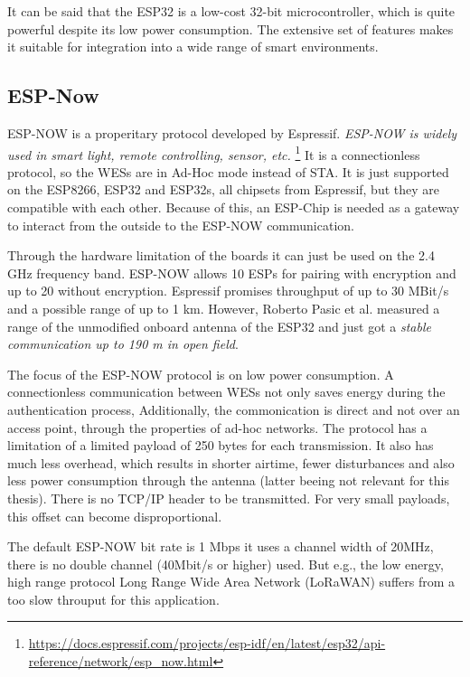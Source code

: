 It can be said that the ESP32 is a low-cost 32-bit microcontroller,
which is quite powerful despite its low power consumption.
The extensive set of features makes it suitable for integration into a wide range of smart environments.
\cite{TheWorkingPrincipalsOfESP32}

\subsection*{ESP-Now}
\label{sub:espnow}
ESP-NOW is a properitary protocol developed by Espressif. 
\emph{ESP-NOW is widely used in smart light, remote controlling, sensor, etc.}
\footnote{\url{https://docs.espressif.com/projects/esp-idf/en/latest/esp32/api-reference/network/esp_now.html}\label{note:espressif}}
It is a connectionless protocol, so the \ac{WES}s are in Ad-Hoc mode instead of \ac{STA}.
It is just supported on the ESP8266, ESP32 and ESP32s, all chipsets from Espressif, but they are compatible with each other.
Because of this, an ESP-Chip is needed as a gateway to interact from the outside to the ESP-NOW communication. 

Through the hardware limitation of the boards it can just be used on the 2.4 GHz frequency band.
ESP-NOW allows 10 ESPs for pairing with encryption and up to 20 without encryption.
Espressif promises throughput of up to 30 MBit/s and a possible range of up to 1 km.
However, Roberto Pasic et al. \cite{ESPNOWCommunication} measured a range of the unmodified onboard antenna of the ESP32 
and just got a \emph{stable communication up to 190 m in open field}.

The focus of the ESP-NOW protocol is on low power consumption.
A connectionless communication between \ac{WES}s not only saves energy during the authentication process, 
Additionally, the commonication is direct and not over an access point, through the properties of ad-hoc networks.
The protocol has a limitation of a limited payload of 250 bytes for each transmission.
It also has much less overhead, which results in shorter airtime, fewer disturbances and also less power consumption through the antenna 
(latter beeing not relevant for this thesis).
There is no TCP/IP header to be transmitted. 
For very small payloads, this offset can become disproportional.

The default ESP-NOW bit rate is 1 Mbps it uses a channel width of 20MHz, 
there is no double channel (40Mbit/s or higher) used.
But e.g., the low energy, 
high range protocol Long Range Wide Area Network (LoRaWAN) suffers from a too slow throuput for this application.

